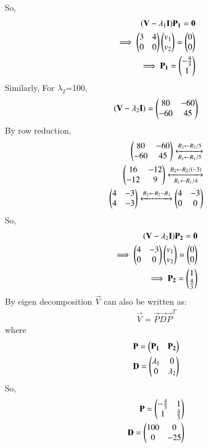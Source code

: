 So, 
\begin{align}
(\mathbf{V} -\lambda_1\mathbf{I})\mathbf{P_1} = \mathbf{0}\\
\implies \begin{pmatrix}3 & 4\\0 & 0\end{pmatrix} \begin{pmatrix}v_1\\v_2\end{pmatrix} = \begin{pmatrix}0\\0\end{pmatrix}\\
\implies \mathbf{P_1} = \begin{pmatrix}-\frac{4}{3}\\1\end{pmatrix}
\end{align}
Similarly,
For $\lambda_2$=100,
\begin{align}
(\mathbf{V} -\lambda_2\mathbf{I}) = \begin{pmatrix}80 & -60\\-60 & 45\end{pmatrix}
\end{align}
By row reduction,
\begin{align}
\begin{pmatrix}80 & -60\\-60 & 45\end{pmatrix}\xleftrightarrow[R_1\leftarrow R_1 /5]{R_2\leftarrow R_2/5}\\
\begin{pmatrix}16 & -12\\-12 & 9\end{pmatrix}\xleftrightarrow[R_1\leftarrow R_1 /4]{R_2\leftarrow R_2/(-3)}\\
\begin{pmatrix}4 & -3\\4 & -3\end{pmatrix}\xleftrightarrow[]{R_2\leftarrow R_2-R_1}\begin{pmatrix}4 & -3\\0 & 0\end{pmatrix}
\end{align}
So, 
\begin{align}
(\mathbf{V} -\lambda_2\mathbf{I})\mathbf{P_2} = \mathbf{0}\\
\implies \begin{pmatrix}4 & -3\\0 & 0\end{pmatrix} \begin{pmatrix}v_1\\v_2\end{pmatrix} = \begin{pmatrix}0\\0\end{pmatrix}\\
\implies \mathbf{P_2} = \begin{pmatrix}1\\ \frac{4}{3}\end{pmatrix}
\end{align}
By eigen decomposition $\vec{V}$ can also be written as:
\begin{align}
\vec{V} = \vec{P}\vec{D}\vec{P}^T
\end{align}
where 
\begin{align}
\mathbf{P} = \begin{pmatrix}\mathbf{P_1} & \mathbf{P_2}\end{pmatrix}\\
\mathbf{D} =\begin{pmatrix}\lambda_1 & 0\\0 & \lambda_2\end{pmatrix}
\end{align}
So, 
\begin{align}
\mathbf{P} = \begin{pmatrix}-\frac{4}{3} & 1\\1 & \frac{4}{3}\end{pmatrix}\\
\mathbf{D} =\begin{pmatrix}100 & 0\\0 & -25\end{pmatrix}
\end{align}
